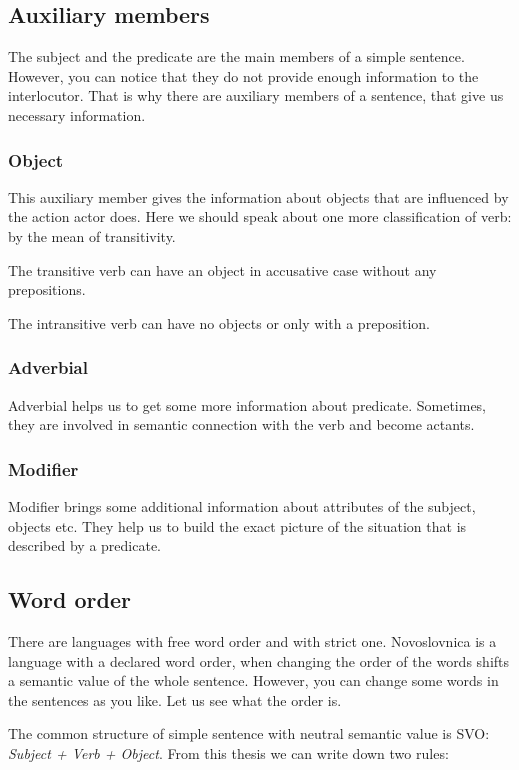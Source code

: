 \subsection{Auxiliary members}

The subject and the predicate are the main members of a simple sentence. However, you can notice that they do not provide  enough information to the interlocutor. That is why there are auxiliary members of a sentence, that give us necessary information.

\subsubsection{Object}
This auxiliary member gives the information about objects that are influenced by the action actor does. 
Here we should speak about one more classification of verb: by the mean of transitivity.

The transitive verb can have an object in accusative case without any prepositions.

The intransitive verb can have no objects or only with a preposition. 

\subsubsection{Adverbial}
Adverbial helps us to get some more information about predicate. Sometimes, they are involved in semantic connection with the verb and become actants. 

\subsubsection{Modifier}
Modifier brings some additional information about attributes of the subject, objects etc. They help us to build the exact picture of the situation that is described by a predicate.

\subsection{Word order}
There are languages with free word order and with strict one. Novoslovnica is a language with a declared word order, when changing the order of the words shifts a semantic value of the whole sentence. However, you can change some words in the sentences as you like. Let us see what the order is.

The common structure of simple sentence with neutral semantic value is SVO: \textit{Subject + Verb + Object}. From this thesis we can write down two rules:

